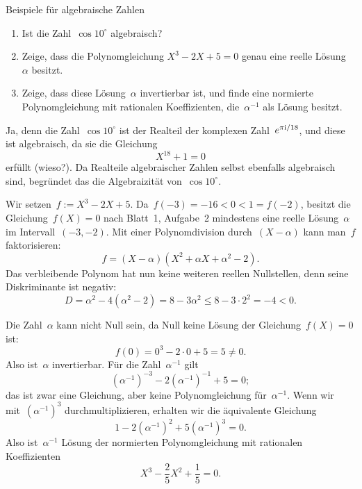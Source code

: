 \documentclass{algblatt}
\begin{document}
\vspace*{-1.5cm}

\begin{aufgabe}{Beispiele für algebraische Zahlen}
\begin{enumerate}
\item Ist die Zahl~$\cos 10^\circ$ algebraisch?
\item Zeige, dass die Polynomgleichung $X^3 - 2X + 5 = 0$ genau eine reelle
Lösung~$\alpha$ besitzt.
\item Zeige, dass diese Lösung~$\alpha$ invertierbar ist, und finde eine normierte
Polynomgleichung mit rationalen Koeffizienten, die~$\alpha^{-1}$ als Lösung besitzt.
\end{enumerate}
\begin{loesungE}
\item Ja, denn die Zahl~$\cos 10^\circ$ ist der Realteil der komplexen
Zahl~$e^{\pi\mathrm{i}/18}$, und diese ist algebraisch, da sie die Gleichung
\[ X^{18} + 1 = 0 \]
erfüllt (wieso?). Da Realteile algebraischer Zahlen selbst ebenfalls
algebraisch sind, begründet das die Algebraizität von~$\cos 10^\circ$.
\item Wir setzen~$f := X^3-2X+5$. Da~$f(-3) =
-16 < 0 < 1 = f(-2)$, besitzt die Gleichung~$f(X) = 0$ nach Blatt~1, Aufgabe~2
mindestens eine reelle Lösung~$\alpha$ im Intervall~$(-3, -2)$. Mit einer Polynomdivision
durch~$(X-\alpha)$ kann man~$f$ faktorisieren:
\[ f = (X - \alpha) (X^2 + \alpha X + \alpha^2-2). \]
Das verbleibende Polynom hat nun keine weiteren reellen Nullstellen, denn seine
Diskriminante ist negativ:
\[ D = \alpha^2 - 4(\alpha^2-2) = 8 - 3 \alpha^2 \leq 8 - 3 \cdot 2^2 = -4 < 0. \]
\item Die Zahl~$\alpha$ kann nicht Null sein, da Null keine Lösung der
Gleichung~$f(X) = 0$ ist:
\[ f(0) = 0^3 - 2 \cdot 0 + 5 = 5 \neq 0. \]
Also ist~$\alpha$ invertierbar. Für die Zahl~$\alpha^{-1}$ gilt
\[ (\alpha^{-1})^{-3} - 2 (\alpha^{-1})^{-1} + 5 = 0; \]
das ist zwar eine Gleichung, aber keine Polynomgleichung für~$\alpha^{-1}$.
Wenn wir mit~$(\alpha^{-1})^3$ durchmultiplizieren, erhalten wir die
äquivalente Gleichung
\[ 1 - 2 (\alpha^{-1})^2 + 5 (\alpha^{-1})^3 = 0. \]
Also ist~$\alpha^{-1}$ Lösung der normierten Polynomgleichung mit rationalen
Koeffizienten
\[ X^3 - \frac{2}{5} X^2 + \frac{1}{5} = 0. \]
\end{loesungE}
\end{aufgabe}
\end{document}
